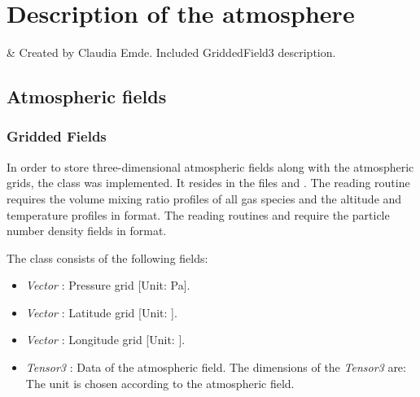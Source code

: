\chapter{Description of the atmosphere}
 \label{sec:atmosphere}

 & Created by Claudia Emde. Included GriddedField3 description.\\ 
\stophistory


\section{Atmospheric fields} 

\subsection{Gridded Fields} 

In order to store three-dimensional atmospheric fields along with the
atmospheric grids, the class  was
implemented. It resides in the files  and
.  The reading routine
 requires the volume mixing ratio profiles of all
gas species and the altitude and temperature profiles in
 format. The reading routines
 and  require
the particle number density fields in  format.

The class  consists of the following fields:
\begin{itemize}
\item {\sl Vector} : Pressure grid [Unit: Pa].
\item {\sl Vector} : Latitude grid [Unit:
  \degree].
\item {\sl Vector} : Longitude grid [Unit:
  \degree].
\item {\sl Tensor3} : Data of the atmospheric
  field. The dimensions of the {\sl Tensor3} are:
  \\
  The unit is chosen according to the atmospheric field. 
\end{itemize} 




